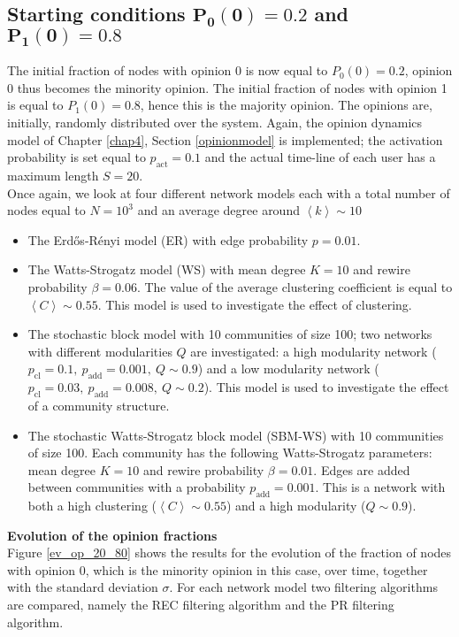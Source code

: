 \documentclass[11 pt , letterpaper , twoside , openright]{book}
\begin{document}
\subsection{Starting conditions $\bm{P_0(0) = 0.2}$ and $\bm{P_1(0)=0.8}$}

The initial fraction of nodes with opinion 0 is now equal to $P_0(0) = 0.2$, opinion 0 thus becomes the minority opinion. The initial fraction of nodes with opinion 1 is equal to $P_1(0) = 0.8$, hence this is the majority opinion. The opinions are, initially, randomly distributed over the system. Again, the opinion dynamics model of Chapter \ref{chap4}, Section \ref{opinionmodel} is implemented; the activation probability is set equal to $p_{\text{act}} = 0.1$ and the actual time-line of each user has a maximum length $S = 20$.\\
\newline
Once again, we look at four different network models each with a total number of nodes equal to $N = 10^3$ and an average degree around $\left<k\right> \sim 10$
\begin{itemize}
	\item The Erd\H{o}s-R\'{e}nyi model (ER) with edge probability $p = 0.01$.
	\item The Watts-Strogatz model (WS) with mean degree $K=10$ and rewire probability $\beta = 0.06$. The value of the average clustering coefficient is equal to $\left<C\right> \sim 0.55$. This model is used to investigate the effect of clustering.
	\newpage
	\item The stochastic block model with 10 communities of size 100; two networks with different modularities $Q$ are investigated: a high modularity network ($p_{\text{cl}} = 0.1,\ p_{\text{add}} = 0.001,\ Q \sim 0.9$) and a low modularity network ($p_{\text{cl}} = 0.03,\ p_{\text{add}} = 0.008,\ Q \sim 0.2$). This model is used to investigate the effect of a community structure.
	\item The stochastic Watts-Strogatz block model (SBM-WS) with 10 communities of size 100. Each community has the following Watts-Strogatz parameters: mean degree $K =10$ and rewire probability $\beta = 0.01$. Edges are added between communities with a probability $p_{\text{add}} = 0.001$. This is a network with both a high clustering ($\left<C\right> \sim 0.55$) and a high modularity ($Q \sim 0.9$).
\end{itemize}
\textbf{Evolution of the opinion fractions}\\
\newline
Figure \ref{ev_op_20_80} shows the results for the evolution of the fraction of nodes with opinion 0, which is the minority opinion in this case, over time, together with the standard deviation $\sigma$. For each network model two filtering algorithms are compared, namely the REC filtering algorithm and the PR filtering algorithm. \\
\end{document}
